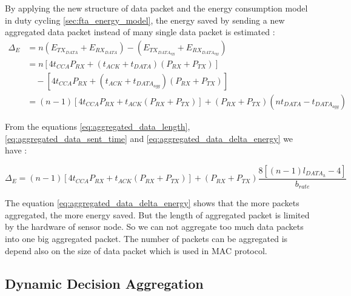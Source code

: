By applying the new structure of data packet and the energy consumption model in duty cycling \ref{sec:fta_energy_model}, the energy saved by sending a new aggregated data packet instead of many single data packet is estimated :
\begin{equation}
\begin{split}
\Delta_E &= n(E_{TX_{DATA}} + E_{RX_{DATA}}) - (E_{TX_{DATA_{agg}}} + E_{RX_{DATA_{agg}}})\\
&= n[4t_{CCA}P_{RX} + (t_{ACK} + t_{DATA})(P_{RX} + P_{TX})] \\
&\quad - [4t_{CCA}P_{RX} + (t_{ACK} + t_{DATA_{agg}})(P_{RX} + P_{TX})] \\
&= (n-1)[4t_{CCA}P_{RX} + t_{ACK}(P_{RX} + P_{TX})] + (P_{RX} + P_{TX})(nt_{DATA} - t_{DATA_{agg}})
\end{split}
\label{eq:aggregated_data_delta_energy}
\end{equation}

From the equations \ref{eq:aggregated_data_length}, \ref{eq:aggregated_data_sent_time} and \ref{eq:aggregated_data_delta_energy} we have :

\begin{equation}
\Delta_E = (n-1)[4t_{CCA}P_{RX} + t_{ACK}(P_{RX} + P_{TX})] + (P_{RX} + P_{TX})\frac{8[(n-1)l_{DATA_{h}} - 4]}{b_{rate}}
\label{eq:aggregated_data_delta_energy}
\end{equation}

The equation \ref{eq:aggregated_data_delta_energy} shows that the more packets aggregated, the more energy saved. But the length of aggregated packet is limited by the hardware of sensor node. So we can not aggregate too much data packets into one big aggregated packet. The number of packets can be aggregated is depend also on the size of data packet which is used in MAC protocol.
\subsection{Dynamic Decision Aggregation}

